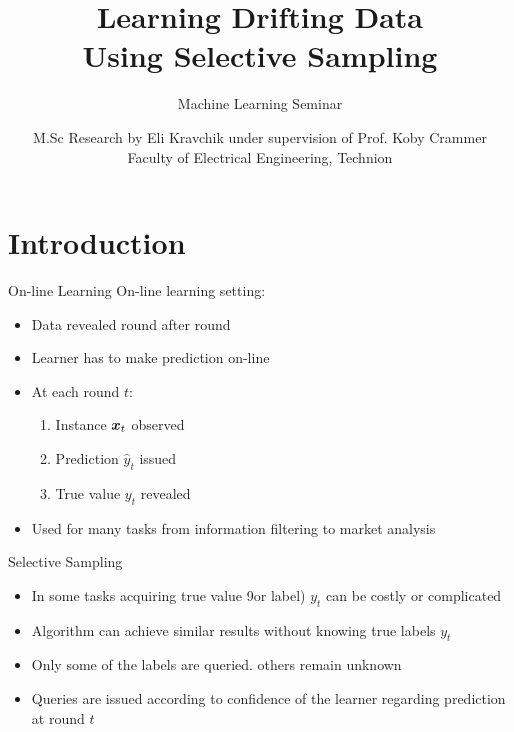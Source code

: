 \documentclass{beamer}
\title{Learning Drifting Data \\Using Selective Sampling}    %
\subtitle{Machine Learning Seminar}
\author{M.Sc Research by Eli Kravchik under supervision of Prof. Koby Crammer\\
Faculty of Electrical Engineering, Technion}
\begin{document}
\maketitle
\section{Introduction}

\begin{frame}{On-line Learning}
On-line learning setting:\newline
\begin{itemize}
\item Data revealed round after round\newline
\item Learner has to make prediction on-line\newline
\item At each round $t$:\newline
\begin{enumerate}
\item Instance ${\boldsymbol{x}}_{t}$ observed\newline
\item Prediction $\hat{y}_t$ issued\newline
\item True value $y_t$ revealed\newline
\end{enumerate}
\item Used for many tasks from information filtering to market analysis
\end{itemize}
\end{frame}


\begin{frame}{Selective Sampling}
\begin{itemize}
\item In some tasks acquiring true value 9or label) $y_t$ can be costly or complicated\newline
\item Algorithm can achieve similar results without knowing true labels $y_t$\newline
\item Only some of the labels are queried. others remain unknown\newline
\item Queries are issued according to confidence of the learner regarding prediction at round $t$
\end{itemize}

\end{frame}
\end{document}
